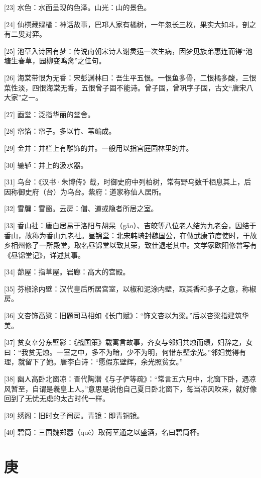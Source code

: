 \documentclass[12pt,UTF8]{ctexbook}
\begin{document}
[23] 水色：水面呈现的色泽。山光：山的景色。

[24] 仙棋藏绿橘：神话故事，巴邛人家有橘树，一年忽长三枚，果实大如斗，剖之有二叟对弈。

[25] 池草入诗因有梦：传说南朝宋诗人谢灵运一次生病，因梦见族弟惠连而得“池塘生春草，园柳变鸣禽”之佳句。

[26] 海棠带恨为无香：宋彭渊林曰：吾生平五恨。一恨鱼多骨，二恨橘多酸，三恨菜性淡，四恨海棠无香，五恨曾子固不能诗。曾子固，曾巩字子固，古文“唐宋八大家”之一。

[27] 画堂：泛指华丽的堂舍。

[28] 帘箔：帘子。多以竹、苇编成。

[29] 金井：井栏上有雕饰的井。一般用以指宫庭园林里的井。

[30] 辘轳：井上的汲水器。

[31] 乌台：《汉书·朱博传》载，时御史府中列柏树，常有野乌数千栖息其上，后因称御史府（台）为乌台。紫府：道家称仙人居所。

[32] 雪牖：雪窗。云房：僧、道或隐者所居之室。

[33] 香山社：唐白居易于洛阳与胡杲（gǎo）、吉皎等八位老人结为九老会，因结于香山，故称为香山九老社。昼锦堂：北宋韩琦封魏国公，在做武康节度使时，于故乡相州修了一所殿堂，取名昼锦堂以致其荣，致仕退老其中。文学家欧阳修曾写有《昼锦堂记》，详述其事。

[34] 蔀屋：指草屋。岩廊：高大的宫殿。

[35] 芬椒涂内壁：汉代皇后所居宫室，以椒和泥涂内壁，取其香和多子之意，称椒房。

[36] 文杏饰高粱：旧题司马相如《长门赋》：“饰文杏以为梁。”后以杏梁指建筑华美。

[37] 贫女幸分东壁影：《战国策》载寓言故事，齐女与邻妇共烛而绩，妇辞之，女曰：“我贫无烛。一室之中，多不为暗，少不为明，何惜东壁余光。”邻妇觉得有理，就留下了她。唐李白诗：“愿假东壁辉，余光照贫女。”

[38] 幽人高卧北窗凉：晋代陶潜《与子俨等疏》：“常言五六月中，北窗下卧，遇凉风暂至，自谓是羲皇上人。”意思是说他自己夏日卧北窗下，每当凉风吹来，就好像回到了无忧无虑的太古时代一样。

[39] 绣阁：旧时女子闺房。青镜：即青铜镜。

[40] 碧筒：三国魏郑悫（què）取荷茎通之以盛酒，名曰碧筒杯。





\chapter{庚}
\end{document}
